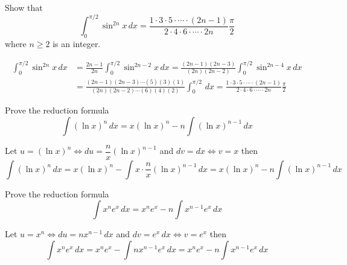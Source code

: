 \begin{problem}
    Show that
    \[\int_0^{\pi/2}\sin^{2n} x\,dx
    =\frac{1\cdot3\cdot5\cdot\cdots\cdot(2n-1)}
    {2\cdot4\cdot6\cdot\cdots\cdot2n}\frac{\pi}{2}\]
    where \(n\geq 2\) is an integer.
\end{problem}
\begin{solution}
    \begin{align*}
        \int_0^{\pi/2}\sin^{2n} x\,dx
        &= \frac{2n-1}{2n}\int_0^{\pi/2}\sin^{2n-2} x\,dx
        =\frac{(2n-1)(2n-3)}{(2n)(2n-2)}\int_0^{\pi/2}\sin^{2n-4} x\,dx \\
        &= \frac{(2n-1)(2n-3)\cdots(5)(3)(1)}{(2n)(2n-2)\cdots(6)(4)(2)}
        \int_0^{\pi/2}\,dx=\frac{1\cdot3\cdot5\cdot\cdots\cdot(2n-1)}
        {2\cdot4\cdot6\cdot\cdots\cdot2n}\frac{\pi}{2} 
    \end{align*}
\end{solution}
\begin{problem}
    Prove the reduction formula
    \[\int(\ln x)^n\,dx=x(\ln x)^n-n\int(\ln x)^{n-1}\,dx\]
\end{problem}
\begin{solution}
    Let \(u=(\ln x)^n\iff du=\dfrac{n}{x}(\ln x)^{n-1}\) and \(dv=dx\iff v=x\)
    then
    \[\int(\ln x)^n\,dx=x(\ln x)^n-\int x\cdot\frac{n}{x}(\ln x)^{n-1}\,dx
    =x(\ln x)^n-n\int(\ln x)^{n-1}\,dx\]
\end{solution}
\begin{problem}
    Prove the reduction formula
    \[\int x^n e^x\,dx=x^n e^x-n\int x^{n-1}e^x\,dx\]
\end{problem}
\begin{solution}
    Let \(u=x^n\iff du=nx^{n-1}\,dx\) and \(dv=e^x\,dx\iff v=e^x\) then
    \[\int x^n e^x\,dx=x^n e^x-\int nx^{n-1}e^x\,dx
    =x^n e^x-n\int x^{n-1}e^x\,dx\]
\end{solution}